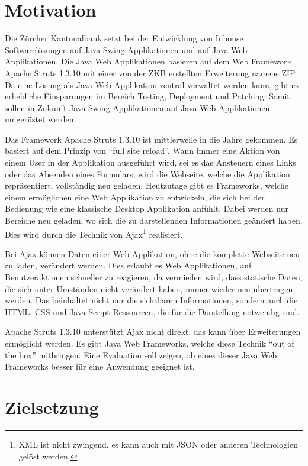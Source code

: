  \section{Motivation}
  
  Die Zürcher Kantonalbank setzt bei der Entwicklung von Inhouse
  Softwarelösungen auf Java Swing Applikationen und auf Java Web Applikationen.
  Die Java Web Applikationen basieren auf dem Web Framework Apache Struts
  1.3.10 mit einer von der ZKB erstellten Erweiterung namens \ac{ZIP}. Da eine
  Lösung als Java Web Applikation zentral verwaltet werden kann, gibt es
  erhebliche Einsparungen im Bereich Testing, Deployment und Patching. Somit
  sollen in Zukunft Java Swing Applikationen auf Java Web Applikationen
  umgerüstet werden.
  
  Das Framework Apache Struts 1.3.10 ist mittlerweile in die Jahre gekommen. Es
  basiert auf dem Prinzip von ``full site reload''. Wann immer eine Aktion
  von einem User in der Applikation ausgeführt wird, sei es das Ansteuern eines
  Links oder das Absenden eines Formulars, wird die Webseite, welche die
  Applikation repräsentiert, vollständig neu geladen. Heutzutage gibt es
  Frameworks, welche einem ermöglichen eine Web Applikation zu entwickeln, die
  sich bei der Bedienung wie eine klassische Desktop Applikation anfühlt. Dabei
  werden nur Bereiche neu geladen, wo sich die zu darstellenden Informationen
  geändert haben. Dies wird durch die Technik von \ac{Ajax}\footnote{XML ist
  nicht zwingend, es kann auch mit JSON oder anderen Technologien gelöst
  werden.} realisiert.
  
  Bei \ac{Ajax} können Daten einer Web Applikation, ohne die komplette Webseite
  neu zu laden, verändert werden. Dies erlaubt es Web Applikationen, auf
  Benutzeraktionen schneller zu reagieren, da vermieden wird, dass statische
  Daten, die sich unter Umständen nicht verändert haben, immer wieder neu
  übertragen werden. Das beinhaltet nicht nur die sichtbaren Informationen,
  sondern auch die \ac{HTML}, \ac{CSS} und Java Script Ressourcen, die für die
  Darstellung notwendig sind.
  
  Apache Struts 1.3.10 unterstützt \ac{Ajax} nicht direkt, das kann über
  Erweiterungen ermöglicht werden. Es gibt Java Web Frameworks, welche diese
  Technik ``out of the box'' mitbringen. Eine Evaluation soll zeigen, ob eines
  dieser Java Web Frameworks besser für eine Anwendung geeignet ist.
  
  \section{Zielsetzung}
  
